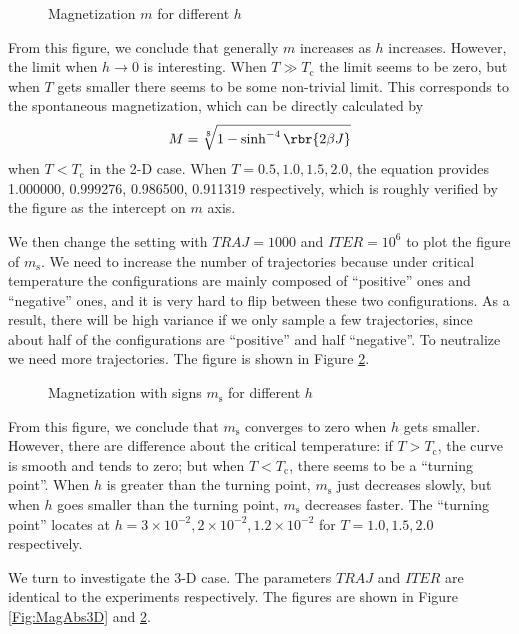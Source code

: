 \documentclass[english, nochinese]{pnote}
\begin{document}
\begin{figure}[htbp]
\centering

\caption{Magnetization $m$ for different $h$}
\label{Fig:MagAbs}
\end{figure}

From this figure, we conclude that generally $m$ increases as $h$ increases. However, the limit when $ h \rightarrow 0 $ is interesting. When $ T \gg T_{\text{c}} $ the limit seems to be zero, but when $T$ gets smaller there seems to be some non-trivial limit. This corresponds to the spontaneous magnetization, which can be directly calculated by
\begin{equation}
M = \sqrt[8]{ 1 - \sinh^{-4} \rbr{ 2 \beta J } }
\end{equation}
when $ T < T_{\text{c}} $ in the 2-D case. When $ T = 0.5, 1.0, 1.5, 2.0 $, the equation provides 1.000000, 0.999276, 0.986500, 0.911319 respectively, which is roughly verified by the figure as the intercept on $m$ axis.

We then change the setting with $ \textit{TRAJ} = 1000 $ and $ \textit{ITER} = 10^6 $ to plot the figure of $m_{\text{s}}$. We need to increase the number of trajectories because under critical temperature the configurations are mainly composed of ``positive'' ones and ``negative'' ones, and it is very hard to flip between these two configurations. As a result, there will be high variance if we only sample a few trajectories, since about half of the configurations are ``positive'' and half ``negative''. To neutralize we need more trajectories. The figure is shown in Figure \ref{Fig:Mag}.

\begin{figure}[htbp]
\centering

\caption{Magnetization with signs $m_{\text{s}}$ for different $h$}
\label{Fig:Mag}
\end{figure}

From this figure, we conclude that $m_{\text{s}}$ converges to zero when $h$ gets smaller. However, there are difference about the critical temperature: if $ T > T_{\text{c}} $, the curve is smooth and tends to zero; but when $ T < T_{\text{c}} $, there seems to be a ``turning point''. When $h$ is greater than the turning point, $m_{\text{s}}$ just decreases slowly, but when $h$ goes smaller than the turning point, $m_{\text{s}}$ decreases faster. The ``turning point'' locates at $ h = 3 \times 10^{-2}, 2 \times 10^{-2}, 1.2 \times 10^{-2} $ for $ T = 1.0, 1.5, 2.0 $ respectively.

We turn to investigate the 3-D case. The parameters $\mathit{TRAJ}$ and $\mathit{ITER}$ are identical to the experiments respectively. The figures are shown in Figure \ref{Fig:MagAbs3D} and \ref{Fig:Mag}.
\end{document}
